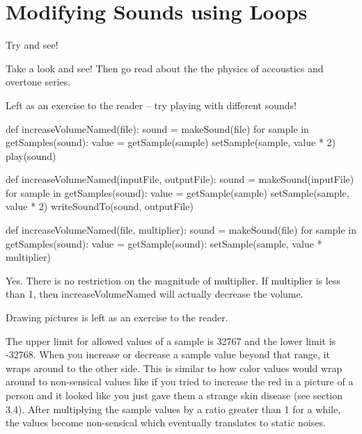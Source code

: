 \chapter{Modifying Sounds using Loops}

\begin{exercises}
\begin{ex}
Try and see!
\end{ex}

\begin{ex}
Take a look and see! Then go read about the the physics of accoustics and
overtone series.
\end{ex}

\begin{ex}
Left as an exercise to the reader -- try playing with different sounds!
\end{ex}

\begin{ex}
\begin{example}
def increaseVolumeNamed(file):
  sound = makeSound(file)
  for sample in getSamples(sound):
    value = getSample(sample)
    setSample(sample, value * 2)
  play(sound)
\end{example}
\end{ex}

\begin{ex}
\begin{example}
def increaseVolumeNamed(inputFile, outputFile):
  sound = makeSound(inputFile)
  for sample in getSamples(sound):
    value = getSample(sample)
    setSample(sample, value * 2)
  writeSoundTo(sound, outputFile)
\end{example}
\end{ex}

\begin{ex}
\begin{example}
def increaseVolumeNamed(file, multiplier):
  sound = makeSound(file)
  for sample in getSamples(sound):
    value = getSample(sound):
    setSample(sample, value * multiplier)
\end{example}

Yes. There is no restriction on the magnitude of multiplier. If multiplier
is less than 1, then increaseVolumeNamed will actually decrease the volume.
\end{ex}

\begin{ex}
Drawing pictures is left as an exercise to the reader.
\end{ex}

\begin{ex}
The upper limit for allowed values of a sample is 32767 and the lower limit
is -32768. When you increase or decrease a sample value beyond that range,
it wraps around to the other side. This is similar to how color values
would wrap around to non-sensical values like if you tried to increase the
red in a picture of a person and it looked like you just gave them a
strange skin disease (see section 3.4). After multiplying the sample values
by a ratio greater than 1 for a while, the values become non-sensical which
eventually translates to static noises.
\end{ex}


\end{exercises}
